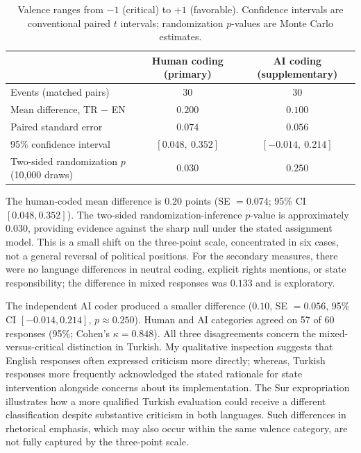 \documentclass[11pt,letterpaper]{article}
\begin{document}
\begin{table}[htbp]
\centering
\caption{Paired language differences in normative valence}
\label{tab:results}
\small
\begin{tabular}{lcc}
\toprule
 & Human coding (primary) & AI coding (supplementary)\\
\midrule
Events (matched pairs) & 30 & 30\\
Mean difference, TR $-$ EN & $0.200$ & $0.100$\\
Paired standard error & $0.074$ & $0.056$\\
95\% confidence interval & $[0.048,\ 0.352]$ & $[-0.014,\ 0.214]$\\
Two-sided randomization $p$ (10,000 draws) & $0.030$ & $0.250$\\
\bottomrule
\end{tabular}
\caption*{\footnotesize Valence ranges from $-1$ (critical) to $+1$ (favorable). Confidence intervals are conventional paired $t$ intervals; randomization $p$-values are Monte Carlo estimates.}
\end{table}

The human-coded mean difference is $0.20$ points (SE $=0.074$; 95\% CI $[0.048,0.352]$). The two-sided randomization-inference $p$-value is approximately $0.030$, providing evidence against the sharp null under the stated assignment model. This is a small shift on the three-point scale, concentrated in six cases, not a general reversal of political positions. For the secondary measures, there were no language differences in neutral coding, explicit rights mentions, or state responsibility; the difference in mixed responses was $0.133$ and is exploratory.

The independent AI coder produced a smaller difference ($0.10$, SE $=0.056$, 95\% CI $[-0.014,0.214]$, $p\approx0.250$). Human and AI categories agreed on 57 of 60 responses (95\%; Cohen's $\kappa=0.848$). All three disagreements concern the mixed-versus-critical distinction in Turkish. My qualitative inspection suggests that English responses often expressed criticism more directly; whereas, Turkish responses more frequently acknowledged the stated rationale for state intervention alongside concerns about its implementation. The Sur expropriation illustrates how a more qualified Turkish evaluation could receive a different classification despite substantive criticism in both languages. Such differences in rhetorical emphasis, which may also occur within the same valence category, are not fully captured by the three-point scale.
\end{document}

